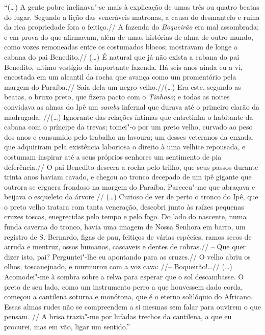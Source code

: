 ``(\ldots{}) A gente pobre inclinava"-se mais à explicação de umas três ou
quatro beatas do lugar. Segundo a lição das veneráveis matronas, a causa
do desmantelo e ruina da rica propriedade fora o feitiço.// A fazenda do
\emph{Boqueirão} era mal assombrada; e em prova do que afirmavam, além
de umas histórias de alma de outro mundo, como vozes remoneadas entre os
costumados blocos; mostravam de longe a cabana do pai Benedito.// (\ldots{})
É natural que já não exista a cabana do pai Benedito, ultimo vestígio da
importante fazenda. Há seis anos ainda eu a vi, encostada em um alcantil
da rocha que avança como um promentório pela margem do Paraíba.// Saia
dela um negro velho.//(\ldots{}) Era este, segundo as beatas, o bruxo preto,
que fizera pacto com o \emph{Tinhoso}; e todas as noites convidava as
almas do Ipê um \emph{samba} infernal que durava até o primeiro clarão
da madrugada. //(\ldots{}) Ignorante das relações íntimas que entretinha o
habitante da cabana com o príncipe da trevas; tomei"-o por um preto
velho, curvado ao peso dos anos e consumido pelo trabalho na lavoura; um
desses veteranos da enxada, que adquiriram pela existência laboriosa o
direito à uma velhice repousada, e costumam inspirar até a seus próprios
senhores um sentimento de pia deferência.// O pai Benedito descera a
rocha pelo trilho, que seus passos durante trinta anos haviam cavado, e
chegou ao tronco decepado de um ipê gigante que outrora se erguera
frondoso na margem do Paraíba. Pareceu"-me que abraçava e beijava o
esqueleto da árvore // (\ldots{}) Curioso de ver de perto o tronco do Ipê,
que o preto velho tratara com tanta veneração, descobri junto às raízes
pequenas cruzes toscas, enegrecidas pelo tempo e pelo fogo. Do lado do
nascente, numa funda caverna do tronco, havia uma imagem de Nossa
Senhora em barro, um registro de S. Bernardo, figas de pau, feitiços de
várias espécies, ramos secos de arruda e mentruz, ossos humanos,
cascaveis e dentes de cobras.// -- Que quer dizer isto, pai?
Perguntei"-lhe eu apontando para as cruzes.// O velho abriu os olhos,
toscanejnado, e murmurou com a voz cava: //-- Boqueirão!\ldots{}// (\ldots{})
Acomodei"-me à sombra sobre a relva para esperar que o sol descambasse. O
preto de seu lado, como um instrumento perro a que houvessem dado corda,
começou a cantilena soturna e monótona, que é o eterno solilóquio do
Africano. Essas almas rudes não se compreendem a si mesmas sem falar
para ouvirem o que pensam. // A brisa trazia"-me por lufadas trechos da
cantilena, a que eu procurei, mas em vão, ligar um sentido.''

